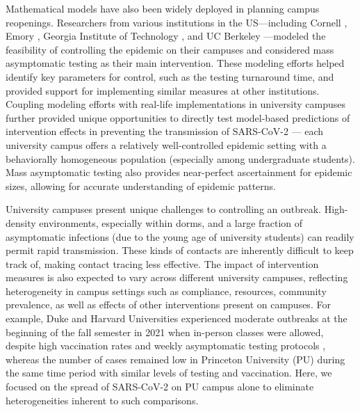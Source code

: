 \documentclass[12pt]{article}
\begin{document}
Mathematical models have also been widely deployed in planning campus reopenings.
Researchers from various institutions in the US---including Cornell \citep{frazier2022modeling}, Emory \citep{lopman2020model}, Georgia Institute of Technology \citep{gibson2021surveillance}, and UC Berkeley \citep{brook2021optimizing}---modeled the feasibility of controlling the epidemic on their campuses and considered mass asymptomatic testing as their main intervention.
These modeling efforts helped identify key parameters for control, such as the testing turnaround time, and provided support for implementing similar measures at other institutions.
Coupling modeling efforts with real-life implementations in university campuses further provided unique opportunities to directly test model-based predictions of intervention effects in preventing the transmission of SARS-CoV-2 \citep{frazier2022modeling}---
each university campus offers a relatively well-controlled epidemic setting with a behaviorally homogeneous population (especially among undergraduate students).
Mass asymptomatic testing also provides near-perfect ascertainment for epidemic sizes, allowing for accurate understanding of epidemic patterns.

University campuses present unique challenges to controlling an outbreak.
High-density environments, especially within dorms, and a large fraction of asymptomatic infections (due to the young age of university students) can readily permit rapid transmission.
These kinds of contacts are inherently difficult to keep track of, making contact tracing less effective.
The impact of intervention measures is also expected to vary across different university campuses, reflecting heterogeneity in campus settings such as compliance, resources, community prevalence, as well as effects of other interventions present on campuses.
For example, Duke and Harvard Universities experienced moderate outbreaks at the beginning of the fall semester in 2021 when in-person classes were allowed, despite high vaccination rates and weekly asymptomatic testing protocols \citep{dukeoutbreak,harvardoutbreak}, whereas the number of cases remained low in Princeton University (PU) during the same time period with similar levels of testing and vaccination.
Here, we focused on the spread of SARS-CoV-2 on PU campus alone to eliminate heterogeneities inherent to such comparisons.
\end{document}
